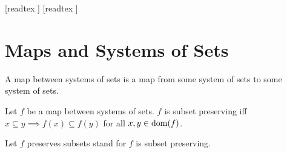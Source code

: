\documentclass[10pt]{article}
\begin{document}
  \begin{imports}
    \begin{forthel}
      [readtex ]
      [readtex ]
    \end{forthel}
  \end{imports}


  \section*{Maps and Systems of Sets}

  \begin{forthel}
    \begin{definition}
      A map between systems of sets is a map from some system of sets to some system of sets.
    \end{definition}
  \end{forthel}

  \begin{forthel}
    \begin{definition}
      Let $f$ be a map between systems of sets.
      $f$ is subset preserving iff $x \subseteq y \implies f(x) \subseteq f(y)$ for all $x, y \in \operatorname{dom}(f)$.
    \end{definition}

    Let $f$ preserves subsets stand for $f$ is subset preserving.
  \end{forthel}
\end{document}
